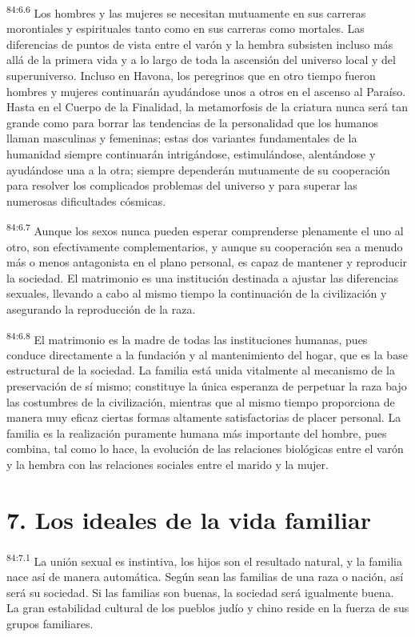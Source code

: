 \documentclass[twoside, 11pt]{book}
\begin{document}
\par
\textsuperscript{84:6.6} Los hombres y las mujeres se necesitan mutuamente en sus carreras morontiales y espirituales tanto como en sus carreras como mortales. Las diferencias de puntos de vista entre el varón y la hembra subsisten incluso más allá de la primera vida y a lo largo de toda la ascensión del universo local y del superuniverso. Incluso en Havona, los peregrinos que en otro tiempo fueron hombres y mujeres continuarán ayudándose unos a otros en el ascenso al Paraíso. Hasta en el Cuerpo de la Finalidad, la metamorfosis de la criatura nunca será tan grande como para borrar las tendencias de la personalidad que los humanos llaman masculinas y femeninas; estas dos variantes fundamentales de la humanidad siempre continuarán intrigándose, estimulándose, alentándose y ayudándose una a la otra; siempre dependerán mutuamente de su cooperación para resolver los complicados problemas del universo y para superar las numerosas dificultades cósmicas.

\par
\textsuperscript{84:6.7} Aunque los sexos nunca pueden esperar comprenderse plenamente el uno al otro, son efectivamente complementarios, y aunque su cooperación sea a menudo más o menos antagonista en el plano personal, es capaz de mantener y reproducir la sociedad. El matrimonio es una institución destinada a ajustar las diferencias sexuales, llevando a cabo al mismo tiempo la continuación de la civilización y asegurando la reproducción de la raza.

\par
\textsuperscript{84:6.8} El matrimonio es la madre de todas las instituciones humanas, pues conduce directamente a la fundación y al mantenimiento del hogar, que es la base estructural de la sociedad. La familia está unida vitalmente al mecanismo de la preservación de sí mismo; constituye la única esperanza de perpetuar la raza bajo las costumbres de la civilización, mientras que al mismo tiempo proporciona de manera muy eficaz ciertas formas altamente satisfactorias de placer personal. La familia es la realización puramente humana más importante del hombre, pues combina, tal como lo hace, la evolución de las relaciones biológicas entre el varón y la hembra con las relaciones sociales entre el marido y la mujer.

\section*{7. Los ideales de la vida familiar}
\par
\textsuperscript{84:7.1} La unión sexual es instintiva, los hijos son el resultado natural, y la familia nace así de manera automática. Según sean las familias de una raza o nación, así será su sociedad. Si las familias son buenas, la sociedad será igualmente buena. La gran estabilidad cultural de los pueblos judío y chino reside en la fuerza de sus grupos familiares.
\end{document}
